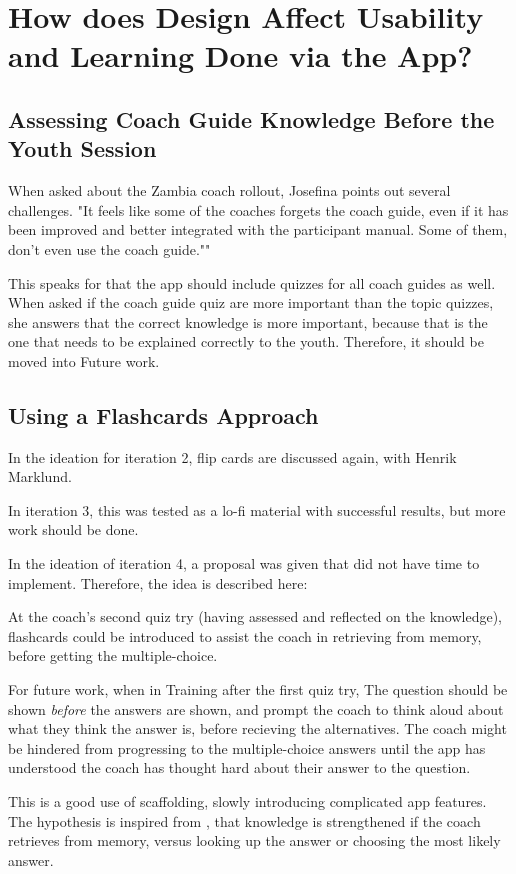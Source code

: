 \section{How does Design Affect Usability and Learning Done via the App?}\label{sec:future-work-4}

\subsection{Assessing Coach Guide Knowledge Before the Youth Session}
When asked about the Zambia coach rollout, Josefina points out several challenges. "It feels like some of the coaches forgets the coach guide, even if it has been improved and better integrated with the participant manual. Some of them, don't even use the coach guide.""

This speaks for that the app should include quizzes for all coach guides as well. When asked if the coach guide quiz are more important than the topic quizzes, she answers that the correct knowledge is more important, because that is the one that needs to be explained correctly to the youth. Therefore, it should be moved into Future work.

\subsection{Using a Flashcards Approach}
In the ideation for iteration 2, flip cards are discussed again, with Henrik Marklund.

In iteration 3, this was tested as a lo-fi material with successful results, but more work should be done.

In the ideation of iteration 4, a proposal was given that did not have time to implement. Therefore, the idea is described here:

At the coach's second quiz try (having assessed and reflected on the knowledge), flashcards could be introduced to assist the coach in retrieving from memory, before getting the multiple-choice.

For future work, when in Training after the first quiz try, The question should be shown \textit{before} the answers are shown, and prompt the coach to think aloud about what they think the answer is, before recieving the alternatives. The coach might be hindered from progressing to the multiple-choice answers until the app has understood the coach has thought hard about their answer to the question.

This is a good use of scaffolding, slowly introducing complicated app features. The hypothesis is inspired from \cite{bjork}, that knowledge is strengthened if the coach retrieves from memory, versus looking up the answer or choosing the most likely answer.

